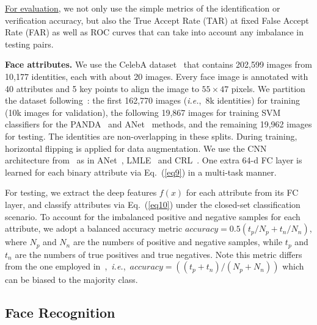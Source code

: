\documentclass[10pt,journal,compsoc]{IEEEtran}
\newcommand{\ie}{\emph{i.e.}}
\begin{document}
\underline{For evaluation}, we not only use the simple metrics of the identification or verification accuracy, but also the True Accept Rate (TAR) at fixed False Accept Rate (FAR) as well as ROC curves that can take into account any imbalance in testing pairs.

\noindent
{\bf Face attributes.} We use the CelebA dataset~\cite{liu15} that contains 202,599 images from 10,177 identities, each with about 20 images. Every face image is annotated with 40 attributes and 5 key points to align the image to $55\times47$ pixels. We partition the dataset following~\cite{liu15}: the first 162,770 images (\ie,~8k identities) for training (10k images for validation), the following 19,867 images for training SVM classifiers for the PANDA~\cite{Ning14} and ANet~\cite{liu15} methods, and the remaining 19,962 images for testing. The identities are non-overlapping in these splits. During training, horizontal flipping is applied for data augmentation. We use the CNN architecture from~\cite{Yi14} as in ANet~\cite{liu15}, LMLE~\cite{huang2016lmle} and CRL~\cite{Dong_2017_ICCV}. One extra 64-d FC layer is learned for each binary attribute via Eq.~(\ref{eq9}) in a multi-task manner.

For testing, we extract the deep features $f(x)$ for each attribute from its FC layer, and classify attributes via Eq.~(\ref{eq10}) under the closed-set classification scenario. To account for the imbalanced positive and negative samples for each attribute, we adopt a balanced accuracy metric $accuracy = 0.5(t_p/N_p + t_n/N_n)$, where $N_p$ and $N_n$ are the numbers of positive and negative samples, while $t_p$ and $t_n$ are the numbers of true positives and true negatives. Note this metric differs from the one employed in~\cite{liu15},~\ie,~$accuracy = ((t_p + t_n) / (N_p + N_n))$ which can be biased to the majority class.

\subsection{Face Recognition}
\end{document}
